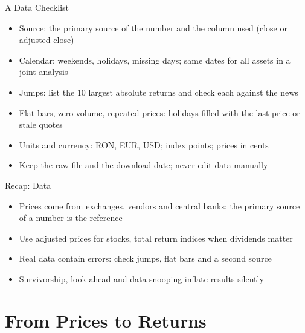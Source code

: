\begin{frame}{A Data Checklist}
\itemsize{\small}
\begin{itemize}
    \item Source: the primary source of the number and the column used (close or adjusted close)
    \item Calendar: weekends, holidays, missing days; same dates for all assets in a joint analysis
    \item Jumps: list the 10 largest absolute returns and check each against the news
    \item Flat bars, zero volume, repeated prices: holidays filled with the last price or stale quotes
    \item Units and currency: RON, EUR, USD; index points; prices in cents
    \item Keep the raw file and the download date; never edit data manually
\end{itemize}
\end{frame}

\begin{frame}{Recap: Data}
\itemsize{\small}
\begin{itemize}
    \item Prices come from exchanges, vendors and central banks; the primary source of a number is the reference
    \item Use adjusted prices for stocks, total return indices when dividends matter
    \item Real data contain errors: check jumps, flat bars and a second source
    \item Survivorship, look-ahead and data snooping inflate results silently
\end{itemize}
\end{frame}


\section{From Prices to Returns}

